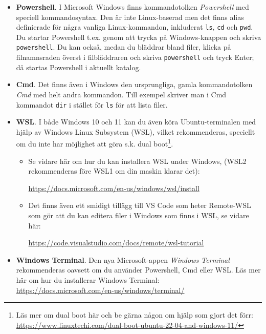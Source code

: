 \begin{itemize}
\item \textbf{Powershell}. I Microsoft Windows finns kommandotolken \textit{Powershell} med speciell kommandosyntax. Den är inte Linux-baserad men det finns alias definierade för några vanliga Linux-kommandon, inkluderat \texttt{ls}, \texttt{cd} och \texttt{pwd}. Du startar Powershell t.ex. genom att trycka på Windows-knappen och skriva \texttt{powershell}. 
Du kan också, medan du bläddrar bland filer, klicka på filnamnsraden överst i filbläddraren och skriva \texttt{powershell} och tryck Enter; då startas Powershell i aktuellt katalog. %

\item \textbf{Cmd}. Det finns även i Windows den ursprungliga, gamla kommandotolken \textit{Cmd} med helt andra kommandon. Till exempel skriver man i Cmd kommandot \texttt{dir} i stället för \texttt{ls} för att lista filer. 

\item \textbf{WSL}. I både Windows 10 och 11 kan du även köra Ubuntu-terminalen med hjälp av Windows Linux Subsystem (WSL), vilket rekommenderas, speciellt om du inte har möjlighet att göra s.k. dual boot\footnote{Läs mer om dual boot här och be gärna någon om hjälp som gjort det förr:\\ \href{https://www.linuxtechi.com/dual-boot-ubuntu-22-04-and-windows-11/}{https://www.linuxtechi.com/dual-boot-ubuntu-22-04-and-windows-11/}}. 




\begin{itemize}[nolistsep]
\item Se vidare här om hur du kan installera WSL under Windows, (WSL2 rekommenderas före WSL1 om din maskin klarar det): 

\url{https://docs.microsoft.com/en-us/windows/wsl/install}

\item Det finns även ett smidigt tillägg till VS Code som heter Remote-WSL som gör att du kan editera filer i Windows som finns i WSL, se vidare här: 

\url{https://code.visualstudio.com/docs/remote/wsl-tutorial}

\end{itemize}

\item \textbf{Windows Terminal}. Den nya Microsoft-appen \textit{Windows Terminal} rekommenderas oavsett om du använder Powershell, Cmd eller WSL. Läs mer här om hur du installerar Windows Terminal: \\
  \url{https://docs.microsoft.com/en-us/windows/terminal/}

\end{itemize}







